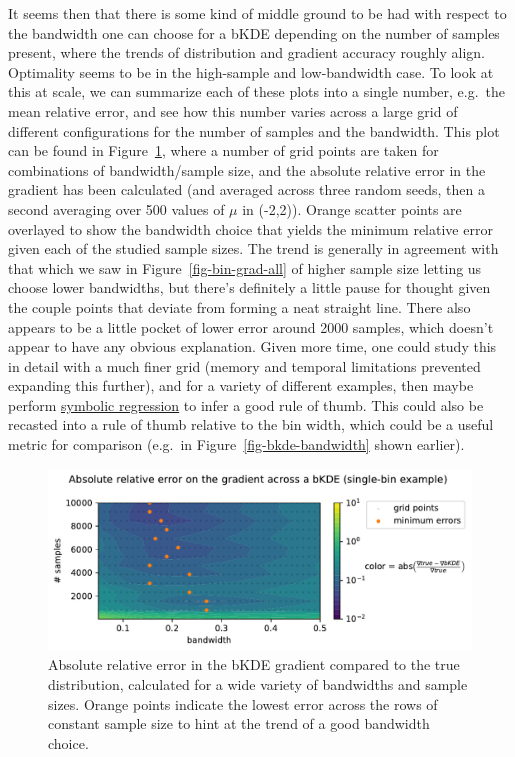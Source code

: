 \documentclass[
  11pt,
  numbers=noendperiod]{book}
\begin{document}
It seems then that there is some kind of middle ground to be had with
respect to the bandwidth one can choose for a bKDE depending on the
number of samples present, where the trends of distribution and gradient
accuracy roughly align. Optimality seems to be in the high-sample and
low-bandwidth case. To look at this at scale, we can summarize each of
these plots into a single number, e.g.~the mean relative error, and see
how this number varies across a large grid of different configurations
for the number of samples and the bandwidth. This plot can be found in
Figure~\ref{fig-grad-errors}, where a number of grid points are taken
for combinations of bandwidth/sample size, and the absolute relative
error in the gradient has been calculated (and averaged across three
random seeds, then a second averaging over 500 values of \(\mu\) in
(-2,2)). Orange scatter points are overlayed to show the bandwidth
choice that yields the minimum relative error given each of the studied
sample sizes. The trend is generally in agreement with that which we saw
in Figure~\ref{fig-bin-grad-all} of higher sample size letting us choose
lower bandwidths, but there's definitely a little pause for thought
given the couple points that deviate from forming a neat straight line.
There also appears to be a little pocket of lower error around 2000
samples, which doesn't appear to have any obvious explanation. Given
more time, one could study this in detail with a much finer grid (memory
and temporal limitations prevented expanding this further), and for a
variety of different examples, then maybe perform
\href{https://github.com/MilesCranmer/PySR}{symbolic regression} to
infer a good rule of thumb. This could also be recasted into a rule of
thumb relative to the bin width, which could be a useful metric for
comparison (e.g.~in Figure~\ref{fig-bkde-bandwidth} shown earlier).

\begin{figure}

{\centering \includegraphics{./images/grad_errors.pdf}

}

\caption{\label{fig-grad-errors}Absolute relative error in the bKDE
gradient compared to the true distribution, calculated for a wide
variety of bandwidths and sample sizes. Orange points indicate the
lowest error across the rows of constant sample size to hint at the
trend of a good bandwidth choice.}

\end{figure}
\end{document}
